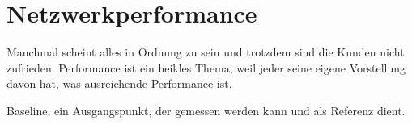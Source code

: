 \chapter{Netzwerkperformance}
\label{cha:netz-performance}

\begin{abstractsec}
  Manchmal scheint alles in Ordnung zu sein und trotzdem sind die Kunden nicht
  zufrieden. Performance ist ein heikles Thema, weil jeder seine eigene
  Vorstellung davon hat, was ausreichende Performance ist.
\end{abstractsec}

\begin{notes}
\item Baseline, ein Ausgangspunkt, der gemessen werden kann und als Referenz
  dient.
\end{notes}









